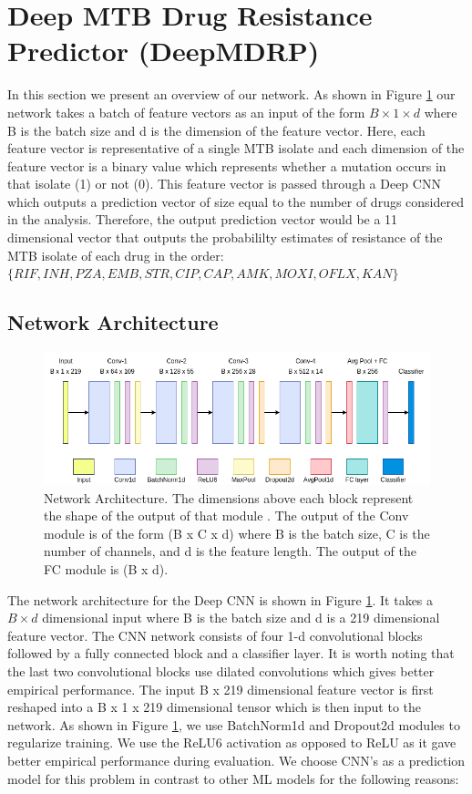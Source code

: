 \documentclass{article}
\begin{document}
\section{Deep MTB Drug Resistance Predictor (DeepMDRP)}
\label{section:network}

In this section we present an overview of our network. As shown in Figure \ref{fig:architecture} our network takes a batch of
feature vectors as an input of the form $B \times 1 \times d$ where B is the batch size and d is the dimension of the feature
vector. Here, each feature vector is representative of a single MTB isolate and each dimension of the feature vector
is a binary value which represents whether a mutation occurs in that isolate (1) or not (0).
This feature vector is passed through a Deep CNN which outputs a prediction vector
of size equal to the number of drugs considered in the analysis. Therefore, the output prediction vector
would be a 11 dimensional vector that outputs the probabililty estimates of resistance of the MTB isolate
of each drug in the order: $\{RIF, INH, PZA, EMB, STR, CIP, CAP, AMK, MOXI, OFLX, KAN\}$

\subsection{Network Architecture}
\begin{figure}[t]
  \centering
  \includegraphics[scale=0.5]{architecture.png}
  \caption{Network Architecture. The dimensions above each block represent the shape of the output of that module
  . The output of the Conv module is of the form (B x C x d) where B is the batch size, C is the number of channels,
  and d is the feature length. The output of the FC module is (B x d).}
  \label{fig:architecture}
\end{figure}

The network architecture for the Deep CNN is shown in Figure \ref{fig:architecture}. It takes a $B \times d$ 
dimensional input where B
is the batch size and d is a 219 dimensional feature vector. The CNN network consists of four 1-d convolutional blocks
followed by a fully connected block and a classifier layer. It is worth noting that the last two
convolutional blocks use dilated convolutions which gives better empirical performance. 
The input B x 219 dimensional feature vector is first reshaped into a B x 1 x 219 dimensional
tensor which is then input to the network. As shown in Figure \ref{fig:architecture}, we use BatchNorm1d \cite{43442}
and Dropout2d \cite{DBLP:journals/corr/TompsonGJLB14} modules
to regularize training. We use the ReLU6 activation as opposed to ReLU as it gave better empirical performance
during evaluation. We choose CNN's as a prediction model for this problem in contrast to other ML models 
for the following reasons:
\end{document}
